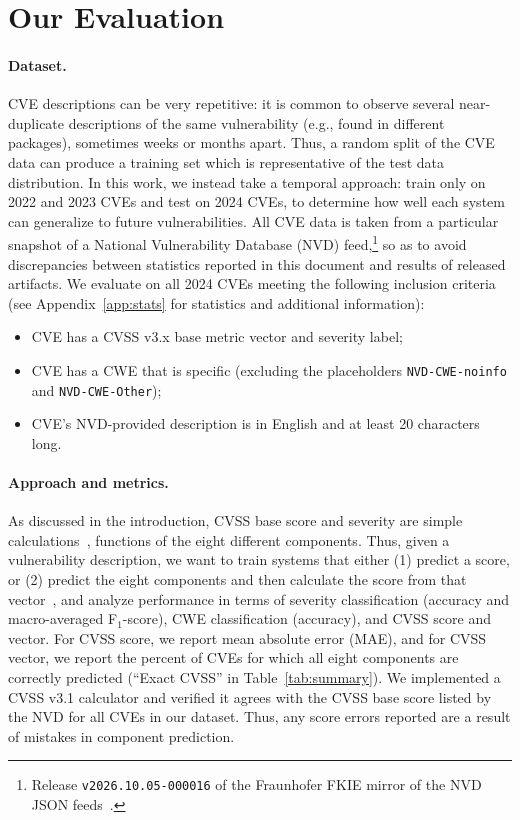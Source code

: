 \section{Our Evaluation}\label{sec:evaluation}

\paragraph{Dataset.}
CVE descriptions can be very repetitive: it is common to observe several near-duplicate descriptions of the same vulnerability (e.g., found in different packages), sometimes weeks or months apart.
Thus, a random split of the CVE data can produce a training set which is representative of the test data distribution.
In this work, we instead take a temporal approach: train only on 2022 and 2023 CVEs and test on 2024 CVEs, to determine how well each system can generalize to future vulnerabilities.
All CVE data is taken from a particular snapshot of a National Vulnerability Database (NVD) feed,\footnote{Release \texttt{v2026.10.05-000016} of the Fraunhofer FKIE mirror of the NVD JSON feeds~\citep{fkie2026nvdfeeds}.} so as to avoid discrepancies between statistics reported in this document and results of released artifacts.
We evaluate on all \nTest{} 2024 CVEs meeting the following inclusion criteria (see Appendix~\ref{app:stats} for statistics and additional information):
\begin{itemize}
  \item CVE has a CVSS v3.x base metric vector and severity label;
  \item CVE has a CWE that is specific (excluding the placeholders \texttt{NVD-CWE-noinfo} and \texttt{NVD-CWE-Other});
  \item CVE's NVD-provided description is in English and at least 20 characters long.
\end{itemize}

\paragraph{Approach and metrics.}
As discussed in the introduction, CVSS base score and severity are simple calculations~\citep{first2019cvss31}, functions of the eight different components.
Thus, given a vulnerability description, we want to train systems that either (1) predict a score, or (2) predict the eight components and then calculate the score from that vector~\citep{elbaz2020fighting,shahid2021cvssbert}, and analyze performance in terms of severity classification (accuracy and macro-averaged F$_1$-score), CWE classification (accuracy), and CVSS score and vector.
For CVSS score, we report mean absolute error (MAE), and for CVSS vector, we report the percent of CVEs for which all eight components are correctly predicted (``Exact CVSS'' in Table~\ref{tab:summary}).
We implemented a CVSS v3.1 calculator and verified it agrees with the CVSS base score listed by the NVD for all \nAll{} CVEs in our dataset.
Thus, any score errors reported are a result of mistakes in component prediction.

